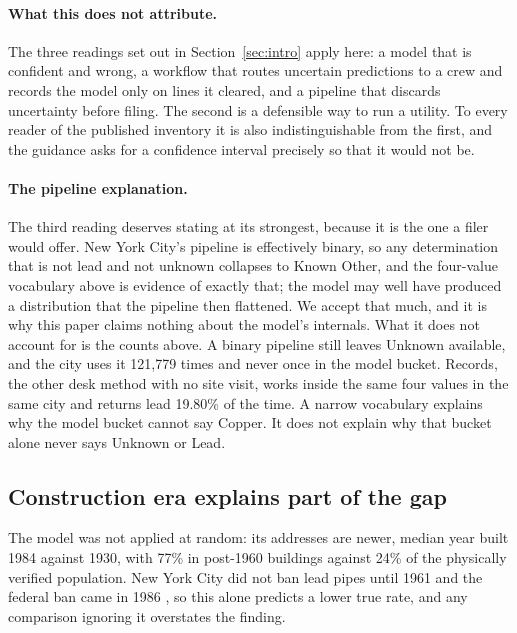 \documentclass[11pt]{article}
\newcommand{\KO}{\textsf{Known Other}}
\begin{document}
\paragraph{What this does not attribute.}
The three readings set out in Section~\ref{sec:intro} apply here: a model that is confident and
wrong, a workflow that routes uncertain predictions to a crew and records the model only on
lines it cleared, and a pipeline that discards uncertainty before filing. The second is a
defensible way to run a utility. To every reader of the published inventory it is also
indistinguishable from the first, and the guidance asks for a confidence interval
\cite{nysdohguidance2025} precisely so that it would not be.

\paragraph{The pipeline explanation.}
The third reading deserves stating at its strongest, because it is the one a filer would
offer. New York City's pipeline is effectively binary, so any determination that is not lead
and not unknown collapses to \KO{}, and the four-value vocabulary above is evidence of exactly
that; the model may well have produced a distribution that the pipeline then flattened. We
accept that much, and it is why this paper claims nothing about the model's internals. What it
does not account for is the counts above. A binary pipeline still leaves \textsf{Unknown} available, and the city uses it 121,779
times and never once in the model bucket. \textsf{Records}, the other desk method with no site
visit, works inside the same four values in the same city and returns lead 19.80\% of the
time. A narrow vocabulary explains why the model bucket cannot say \textsf{Copper}. It does
not explain why that bucket alone never says \textsf{Unknown} or \textsf{Lead}.

\subsection{Construction era explains part of the gap}

The model was not applied at random: its addresses are newer, median year built 1984 against
1930, with 77\% in post-1960 buildings against 24\% of the physically verified population.
New York City did not ban lead pipes until 1961 and the federal ban came in 1986
\cite{osc2026}, so this alone predicts a lower true rate, and any comparison ignoring it
overstates the finding.
\end{document}
